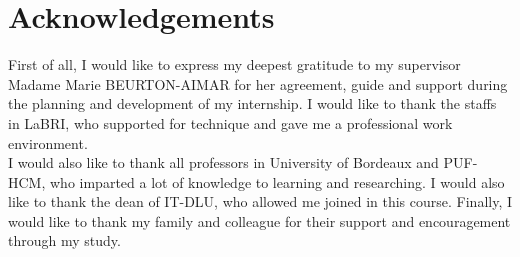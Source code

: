 \chapter*{Acknowledgements}
\thispagestyle{empty}
\indent First of all, I would like to express my deepest gratitude to my supervisor Madame Marie BEURTON-AIMAR for her agreement, guide and support during the planning and development of my internship. I would like to thank the staffs in LaBRI, who supported for technique and gave me a professional work environment. 
\\[0.3cm]
I would also like to thank all professors in University of Bordeaux and PUF-HCM, who imparted a lot of knowledge to learning and researching. I would also like to thank the dean of IT-DLU, who allowed me joined in this course. 
Finally, I would like to thank my family and colleague for their support and encouragement through my study.
\clearpage